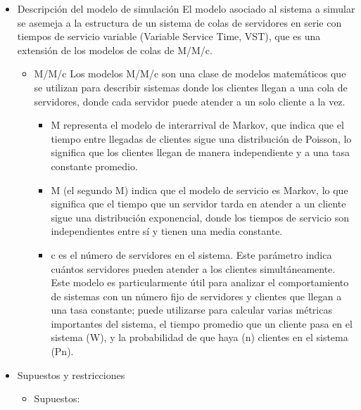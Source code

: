 \documentclass[
]{article}
\providecommand{\tightlist}{%
  \setlength{\itemsep}{0pt}\setlength{\parskip}{0pt}}
\begin{document}
\begin{itemize}
\item
  Descripción del modelo de simulación El modelo asociado al sistema a
  simular se asemeja a la estructura de un sistema de colas de
  servidores en serie con tiempos de servicio variable (Variable Service
  Time, VST), que es una extensión de los modelos de colas de M/M/c.

  \begin{itemize}
  \tightlist
  \item
    M/M/c Los modelos M/M/c son una clase de modelos matemáticos que se
    utilizan para describir sistemas donde los clientes llegan a una
    cola de servidores, donde cada servidor puede atender a un solo
    cliente a la vez.

    \begin{itemize}
    \tightlist
    \item
      M representa el modelo de interarrival de Markov, que indica que
      el tiempo entre llegadas de clientes sigue una distribución de
      Poisson, lo significa que los clientes llegan de manera
      independiente y a una tasa constante promedio.
    \item
      M (el segundo M) indica que el modelo de servicio es Markov, lo
      que significa que el tiempo que un servidor tarda en atender a un
      cliente sigue una distribución exponencial, donde los tiempos de
      servicio son independientes entre sí y tienen una media constante.
    \item
      c es el número de servidores en el sistema. Este parámetro indica
      cuántos servidores pueden atender a los clientes simultáneamente.
      Este modelo es particularmente útil para analizar el
      comportamiento de sistemas con un número fijo de servidores y
      clientes que llegan a una tasa constante; puede utilizarse para
      calcular varias métricas importantes del sistema, el tiempo
      promedio que un cliente pasa en el sistema (W), y la probabilidad
      de que haya (n) clientes en el sistema (Pn).
    \end{itemize}
  \end{itemize}
\item
  Supuestos y restricciones

  \begin{itemize}
  \tightlist
  \item
    Supuestos:


\end{itemize}
\end{itemize}
\end{document}
